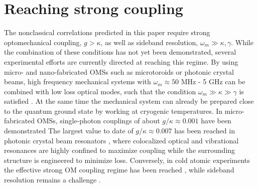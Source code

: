 \section{Reaching strong coupling}
\label{sect:Experimental values}


The nonclassical correlations predicted in this paper 
require  strong optomechanical coupling, $g > \kappa$, 
as well as sideband resolution, $\omega_m \gg \kappa,\gamma$. 
While the combination of these conditions has not 
yet been demonstrated, 
several experimental efforts 
are currently 
directed at reaching this regime. 
By using micro- and nano-fabricated OMSs such 
as microtoroids or photonic crystal beams, 
high frequency mechanical systems  with 
$\omega_m\approx 50$ MHz - 5 GHz can be combined 
with low loss optical modes, such that the 
condition $\omega_m \gg \kappa \gg \gamma$ is satisfied
\cite{Safavi-Naeini2011a, Schliesser2008, Eichenfield2009}.
At the same time the mechanical system can already 
be prepared close to the quantum ground state by working at cryogenic temperatures. 
In micro-fabricated OMSs, single-photon couplings of 
about $g/\kappa \approx 0.001$ have been demonstrated 
\cite{Eichenfield2009, Ding2011,Verhagen2011}
The largest value to date of $g/\kappa \approx 0.007$ 
has been reached in photonic crystal beam
resonators \cite{Chan2012}, where
colocalized optical and vibrational resonances are
highly confined to maximize coupling
while the surrounding structure is engineered  
to minimize loss.
Conversely, in cold atomic experiments
the effective strong OM coupling regime has been
reached \cite{Purdy2010}, while sideband resolution remains
a challenge \cite{Stamper-kurn}. 




